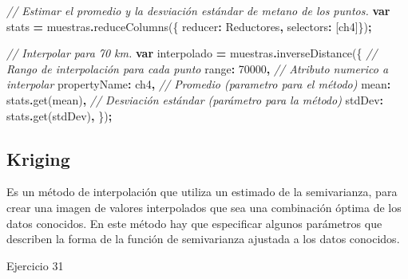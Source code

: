 \documentclass[
  12pt,
  letterpaper,
  twoside]{book}
\newenvironment{Shaded}{\begin{snugshade}}{\end{snugshade}}
\newcommand{\CommentTok}[1]{\textcolor[rgb]{0.56,0.35,0.01}{\textit{#1}}}
\newcommand{\DataTypeTok}[1]{\textcolor[rgb]{0.13,0.29,0.53}{#1}}
\newcommand{\DecValTok}[1]{\textcolor[rgb]{0.00,0.00,0.81}{#1}}
\newcommand{\FunctionTok}[1]{\textcolor[rgb]{0.00,0.00,0.00}{#1}}
\newcommand{\KeywordTok}[1]{\textcolor[rgb]{0.13,0.29,0.53}{\textbf{#1}}}
\newcommand{\NormalTok}[1]{#1}
\newcommand{\OperatorTok}[1]{\textcolor[rgb]{0.81,0.36,0.00}{\textbf{#1}}}
\newcommand{\StringTok}[1]{\textcolor[rgb]{0.31,0.60,0.02}{#1}}
\begin{document}
\begin{Shaded}
\begin{Highlighting}[]
\CommentTok{// Estimar el promedio y la desviación estándar de metano de los puntos.}
\KeywordTok{var}\NormalTok{ stats }\OperatorTok{=}\NormalTok{ muestras}\OperatorTok{.}\FunctionTok{reduceColumns}\NormalTok{(\{}
  \DataTypeTok{reducer}\OperatorTok{:}\NormalTok{ Reductores}\OperatorTok{,}
  \DataTypeTok{selectors}\OperatorTok{:}\NormalTok{ [}\StringTok{\textquotesingle{}ch4\textquotesingle{}}\NormalTok{]\})}\OperatorTok{;}

\CommentTok{// Interpolar para 70 km.}
\KeywordTok{var}\NormalTok{ interpolado }\OperatorTok{=}\NormalTok{ muestras}\OperatorTok{.}\FunctionTok{inverseDistance}\NormalTok{(\{}
  \CommentTok{// Rango de interpolación para cada punto}
  \DataTypeTok{range}\OperatorTok{:} \DecValTok{70000}\OperatorTok{,} 
  \CommentTok{// Atributo numerico a interpolar}
  \DataTypeTok{propertyName}\OperatorTok{:} \StringTok{\textquotesingle{}ch4\textquotesingle{}}\OperatorTok{,} 
  \CommentTok{// Promedio (parametro para el método)}
  \DataTypeTok{mean}\OperatorTok{:}\NormalTok{ stats}\OperatorTok{.}\FunctionTok{get}\NormalTok{(}\StringTok{\textquotesingle{}mean\textquotesingle{}}\NormalTok{)}\OperatorTok{,} 
  \CommentTok{// Desviación estándar (parámetro para la método)}
  \DataTypeTok{stdDev}\OperatorTok{:}\NormalTok{ stats}\OperatorTok{.}\FunctionTok{get}\NormalTok{(}\StringTok{\textquotesingle{}stdDev\textquotesingle{}}\NormalTok{)}\OperatorTok{,} 
\NormalTok{  \})}\OperatorTok{;} 
\end{Highlighting}
\end{Shaded}

\hypertarget{kriging}{%
\subsection{Kriging}\label{kriging}}

Es un método de interpolación que utiliza un estimado de la semivarianza, para crear una imagen de valores interpolados que sea una combinación óptima de los datos conocidos. En este método hay que especificar algunos parámetros que describen la forma de la función de semivarianza ajustada a los datos conocidos.

Ejercicio 31
\end{document}
